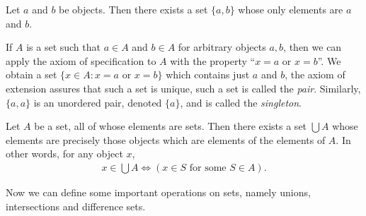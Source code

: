 \begin{axiom}
    Let $a$ and $b$ be objects. Then there exists a set $\{a, b\}$ whose only elements are $a$ and $b$.
\end{axiom}

If $A$ is a set such that $a \in A$ and $b \in A$ for arbitrary objects $a, b$, then we can apply the axiom of specification to $A$ with the property ``$x = a$ or $x = b$''. We obtain a set $\{x \in A : x = a \text{ or } x = b\}$ which contains just $a$ and $b$, the axiom of extension assures that such a set is unique, such a set is called the \emph{pair}. Similarly, $\{a, a\}$ is an unordered pair, denoted $\{a\}$, and is called the \emph{singleton}.

\begin{axiom}
    Let $A$ be a set, all of whose elements are sets. Then there exists a set $\bigcup A$ whose elements are precisely those objects which are elements of the elements of $A$. In other words, for any object $x$,
        \begin{align*}
            x \in \bigcup A
            \Longleftrightarrow
            (x \in S \text{ for some } S \in A).
        \end{align*}
\end{axiom}

\begin{comment}
If $A$ is a set which elements are sets, we usually call it a \emph{collection} instead of a set. By the axiom of union, for every collection $A$ there exists a set $U$ such that if $x \in S$ for some $S \in A$, then $x \in U$. We can apply the axiom of specification to form the set
    \begin{align*}
        \{x \in U : x \in S \text{ for some } S \in A\},
    \end{align*}
note that the axiom of extension guarantees its uniqueness.
\end{comment}

Now we can define some important operations on sets, namely unions, intersections and difference sets.
\begin{comment}
The \emph{unions} $S_1 \cup S_2$ of two sets is defined to be
    \begin{align*}
        S_1 \cup S_2 := \bigcup\{S_1, S_2\}.
    \end{align*}
This equivalent to say that for each $x \in S_1 \cup S_2$ we have $x \in S_1$ or $x \in S_2$. Observe that the existence and uniqueness of $S_1 \cup S_2$ are guaranteed by the axioms of pairing, union, and extension.
\end{comment}

